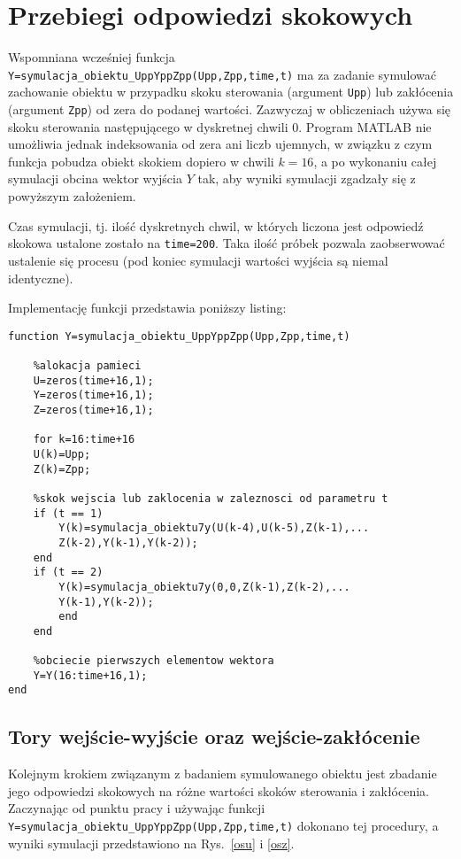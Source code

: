 
\chapter{Przebiegi odpowiedzi skokowych}

Wspomniana wcześniej funkcja \verb+Y=symulacja_obiektu_UppYppZpp(Upp,Zpp,time,t)+ ma za zadanie symulować zachowanie obiektu w przypadku skoku sterowania (argument \verb+Upp+) lub zakłócenia (argument \verb+Zpp+) od zera do podanej wartości. Zazwyczaj w obliczeniach używa się skoku sterowania następującego w dyskretnej chwili 0. Program MATLAB nie umożliwia jednak indeksowania od zera ani liczb ujemnych, w związku z czym funkcja pobudza obiekt skokiem dopiero w chwili $k=16$, a po wykonaniu całej symulacji obcina wektor wyjścia $Y$ tak, aby wyniki symulacji zgadzały się z powyższym założeniem.

Czas symulacji, tj. ilość dyskretnych chwil, w których liczona jest odpowiedź skokowa ustalone zostało na \verb+time=200+. Taka ilość próbek pozwala zaobserwować ustalenie się procesu (pod koniec symulacji wartości wyjścia są niemal identyczne).

Implementację funkcji przedstawia poniższy listing:

\begin{lstlisting}[style=customc,frame=single]
function Y=symulacja_obiektu_UppYppZpp(Upp,Zpp,time,t)

	%alokacja pamieci
	U=zeros(time+16,1);
	Y=zeros(time+16,1);
	Z=zeros(time+16,1);
	
	for k=16:time+16
	U(k)=Upp;
	Z(k)=Zpp;
	
	%skok wejscia lub zaklocenia w zaleznosci od parametru t
	if (t == 1)
		Y(k)=symulacja_obiektu7y(U(k-4),U(k-5),Z(k-1),...
		Z(k-2),Y(k-1),Y(k-2));
	end
	if (t == 2)
		Y(k)=symulacja_obiektu7y(0,0,Z(k-1),Z(k-2),...
		Y(k-1),Y(k-2));
		end
	end
	
	%obciecie pierwszych elementow wektora
	Y=Y(16:time+16,1);
end
\end{lstlisting}

\section{Tory wejście-wyjście oraz wejście-zakłócenie}
Kolejnym krokiem związanym z badaniem symulowanego obiektu jest zbadanie jego odpowiedzi skokowych na różne wartości skoków sterowania i zakłócenia. Zaczynając od punktu pracy i używając funkcji \verb+Y=symulacja_obiektu_UppYppZpp(Upp,Zpp,time,t)+ dokonano tej procedury, a wyniki symulacji przedstawiono na Rys.~\ref{osu} i \ref{osz}. 

